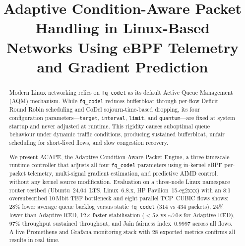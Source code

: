 \documentclass[conference]{IEEEtran}
\begin{document}
\title{Adaptive Condition-Aware Packet Handling in Linux-Based\\
Networks Using eBPF Telemetry and Gradient Prediction}

\author{
\and
{}
\and
{}
}

\maketitle

\begin{abstract}
Modern Linux networking relies on \texttt{fq\_codel} as its default Active
Queue Management (AQM) mechanism. While \texttt{fq\_codel} reduces bufferbloat
through per-flow Deficit Round Robin scheduling and CoDel sojourn-time-based
dropping, its four configuration parameters---\texttt{target}, \texttt{interval},
\texttt{limit}, and \texttt{quantum}---are fixed at system startup and never
adjusted at runtime. This rigidity causes suboptimal queue behaviour under
dynamic traffic conditions, producing sustained bufferbloat, unfair scheduling
for short-lived flows, and slow congestion recovery.

We present ACAPE, the Adaptive Condition-Aware Packet Engine, a three-timescale
runtime controller that adjusts all four \texttt{fq\_codel} parameters using
in-kernel eBPF per-packet telemetry, multi-signal gradient estimation, and
predictive AIMD control, without any kernel source modification. Evaluation on
a three-node Linux namespace router testbed (Ubuntu~24.04~LTS, Linux~6.8.x,
HP Pavilion~15-eg2xxx) with an 8:1 oversubscribed 10\,Mbit TBF bottleneck and
eight parallel TCP~CUBIC flows shows: 28\% lower average queue backlog versus
static \texttt{fq\_codel} (314 vs 434 packets), 24\% lower than Adaptive RED,
12$\times$ faster stabilisation ($<$5\,s vs $\sim$70\,s for Adaptive RED),
97\% throughput sustained throughout, and Jain fairness index~0.9997 across all
flows. A live Prometheus and Grafana monitoring stack with 28 exported metrics
confirms all results in real time.
\end{abstract}
\end{document}
